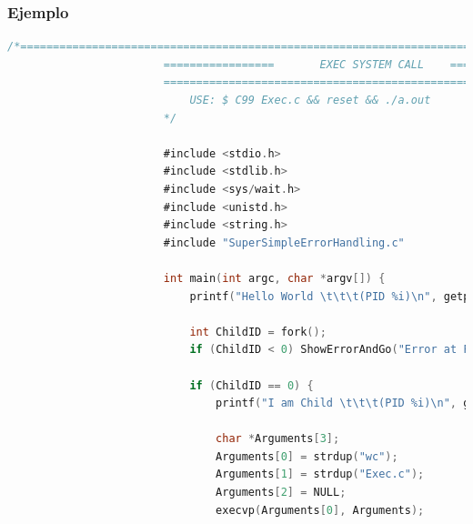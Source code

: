 \documentclass[12pt, fleqn]{report}                             %
\begin{document}
                \subsubsection{Ejemplo}
                    \begin{lstlisting}[language=C, gobble=24]
                        /*=======================================================================
                        =================       EXEC SYSTEM CALL    =============================
                        =========================================================================
                            USE: $ C99 Exec.c && reset && ./a.out
                        */

                        #include <stdio.h>                                                  //We will need this
                        #include <stdlib.h>                                                 //We will need this        
                        #include <sys/wait.h>                                               //We will need this  
                        #include <unistd.h>                                                 //We will need this        
                        #include <string.h>                                                 //We will need this        
                        #include "SuperSimpleErrorHandling.c"                               //My simple code :p

                        int main(int argc, char *argv[]) {                                  //Fucking main
                            printf("Hello World \t\t\t(PID %i)\n", getpid());               //Show me your ID

                            int ChildID = fork();                                           //Now create a new process
                            if (ChildID < 0) ShowErrorAndGo("Error at Fork", 1);            //Go an show it

                            if (ChildID == 0) {                                             // === YOU ARE THE CHILD =====
                                printf("I am Child \t\t\t(PID %i)\n", getpid());            //Show me your ID then kid

                                char *Arguments[3];                                         //Create an array of strings :D
                                Arguments[0] = strdup("wc");                                //New program: "wc" (word count)
                                Arguments[1] = strdup("Exec.c");                            //Argument to wc: file to count
                                Arguments[2] = NULL;                                        //End of array
                                execvp(Arguments[0], Arguments);                            //Run wc & 'exit' process
                                

\end{lstlisting}
\end{document}
